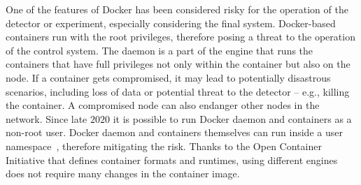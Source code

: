 One of the features of Docker has been considered risky for the operation of the detector or experiment, especially considering the final system. Docker-based containers run with the root privileges, therefore posing a threat to the operation of the control system. The daemon is a part of the engine that runs the containers that have full privileges not only within the container but also on the node. If a container gets compromised, it may lead to potentially disastrous scenarios, including loss of data or potential threat to the detector -- e.g., killing the container. A compromised node can also endanger other nodes in the network.  Since late $2020$ it is possible to run Docker daemon and containers as a non-root user. Docker daemon and containers themselves can run inside a user namespace~\cite{docker_limitations}, therefore mitigating the risk.
 Thanks to the Open Container Initiative that defines container formats and runtimes, using different engines does not require many changes in the container image. 

